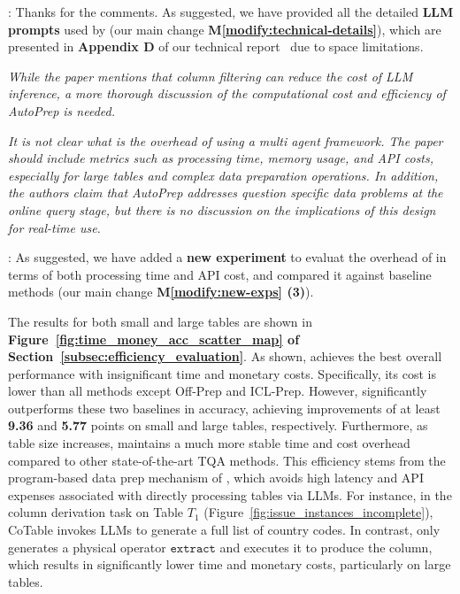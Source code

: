 : Thanks for the comments. As suggested, we have provided all the detailed \textbf{LLM prompts} used by \sys (our main change \textbf{M\ref{modify:technical-details}}), which are presented in \textbf{Appendix D} of our technical report~\cite{technical_report} due to space limitations.



\begin{shaded}
{
\emph{While the paper mentions that column filtering can reduce the cost of LLM inference, a more thorough discussion of the computational cost and efficiency of AutoPrep is needed.}

\emph{It is not clear what is the overhead of using a multi agent framework. The paper should include metrics such as processing time, memory usage, and API costs, especially for large tables and complex data preparation operations. In addition, the authors claim that AutoPrep addresses question specific data problems at the online query stage, but there is no discussion on the implications of this design for real-time use.}
}
\end{shaded}

: 
As suggested, we have added a \textbf{new experiment} to evaluat the overhead of \sys in terms of both processing time and API cost, and compared it against baseline methods (our main change \textbf{M\ref{modify:new-exps} (3)}).

The results for both small and large tables are shown in \textbf{Figure~\ref{fig:time_money_acc_scatter_map} of Section~\ref{subsec:efficiency_evaluation}}.
As shown, \sys achieves the best overall performance with insignificant time and monetary costs. Specifically, its cost is lower than all methods except Off-Prep and ICL-Prep. However, \sys significantly outperforms these two baselines in accuracy, achieving improvements of at least \textbf{9.36} and \textbf{5.77} points on small and large tables, respectively. Furthermore, as table size increases, \sys maintains a much more stable time and cost overhead compared to other state-of-the-art TQA methods.
This efficiency stems from the program-based data prep mechanism of \sys, which avoids high latency and API expenses associated with directly processing tables via LLMs. For instance, in the column derivation task on Table $T_1$ (Figure~\ref{fig:issue_instances_incomplete}), CoTable invokes LLMs to generate a full list of country codes. In contrast, \sys only generates a physical operator $\mathtt{extract}$ and executes it to produce the column, which results in significantly lower time and monetary costs, particularly on large tables.

